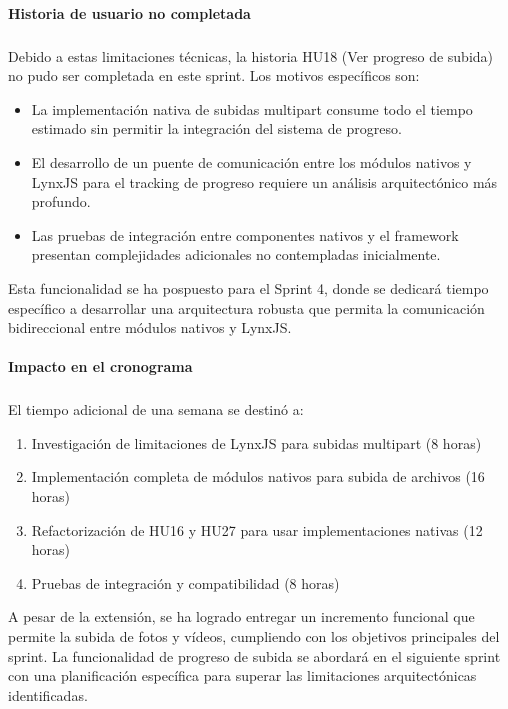 \paragraph{Historia de usuario no completada}
\subparagraph{}

Debido a estas limitaciones técnicas, la historia HU18 (Ver progreso de subida) no pudo ser completada en este sprint. Los motivos específicos son:

\begin{itemize}
    \item La implementación nativa de subidas multipart consume todo el tiempo estimado sin permitir la integración del sistema de progreso.
    \item El desarrollo de un puente de comunicación entre los módulos nativos y LynxJS para el tracking de progreso requiere un análisis arquitectónico más profundo.
    \item Las pruebas de integración entre componentes nativos y el framework presentan complejidades adicionales no contempladas inicialmente.
\end{itemize}

Esta funcionalidad se ha pospuesto para el Sprint 4, donde se dedicará tiempo específico a desarrollar una arquitectura robusta que permita la comunicación bidireccional entre módulos nativos y LynxJS.

\paragraph{Impacto en el cronograma}
\subparagraph{}

El tiempo adicional de una semana se destinó a:
\begin{enumerate}
    \item Investigación de limitaciones de LynxJS para subidas multipart (8 horas)
    \item Implementación completa de módulos nativos para subida de archivos (16 horas)
    \item Refactorización de HU16 y HU27 para usar implementaciones nativas (12 horas)
    \item Pruebas de integración y compatibilidad (8 horas)
\end{enumerate}

A pesar de la extensión, se ha logrado entregar un incremento funcional que permite la subida de fotos y vídeos, cumpliendo con los objetivos principales del sprint. La funcionalidad de progreso de subida se abordará en el siguiente sprint con una planificación específica para superar las limitaciones arquitectónicas identificadas.
